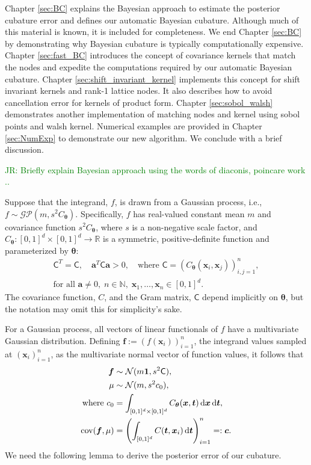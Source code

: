 \documentclass{iitthesis}          %
\newcommand{\bm}[1]{\boldsymbol{#1}}
\newcommand{\dif}[1]{\text{d}{#1}}
\newcommand{\D}[1]{\text{d}{#1}}
\newcommand{\vtheta}{{\bm{\theta}}}
\newcommand{\va}{\bm{a}}
\newcommand{\vc}{\bm{c}}
\newcommand{\vf}{\bm{f}}
\newcommand{\vt}{\bm{t}}
\newcommand{\vx}{\bm{x}}
\newcommand{\vone}{\bm{1}}
\newcommand{\mC}{\mathsf{C}}
\newcommand{\cov}{{\textup{cov}}}
\newcommand{\calN}{\mathcal{N}}
\newcommand{\JRNote}[1]{{\textcolor{green}{JR: #1}}}
\begin{document}
Chapter \ref{sec:BC} explains the Bayesian approach to estimate the posterior cubature error and defines our automatic Bayesian cubature. Although much of this material is known, it is included for completeness.  We end Chapter \ref{sec:BC}  by demonstrating why Bayesian cubature is typically computationally expensive.
Chapter \ref{sec:fast_BC}  introduces the concept of covariance kernels that match the nodes and expedite the computations required by our automatic Bayesian cubature. 
Chapter \ref{sec:shift_invariant_kernel} implements this concept for shift invariant kernels and rank-1 lattice nodes.  It also describes how to avoid cancellation error for kernels of product form.  
Chapter \ref{sec:sobol_walsh} demonstrates another implementation of matching nodes and kernel using sobol points and walsh kernel.
Numerical examples are provided in Chapter \ref{sec:NumExp} to demonstrate our new algorithm.  We conclude with a brief discussion.



\label{sec:BC} 
\JRNote{Briefly explain Bayesian approach using the words of diaconis, poincare work ..}

\label{sec:BayesPostErr}

Suppose that the integrand, $f$, is drawn from a Gaussian process, i.e., $f \sim \mathcal{GP}(m,s^2 C_\vtheta)$.  Specifically, $f$ has real-valued constant mean $m$ and covariance function $s^2C_\vtheta$, where $s$ is a non-negative scale factor, and $C_\vtheta: [0,1]^d \times [0,1]^d \to \mathbb{R} $ is a symmetric, positive-definite function and parameterized by $\vtheta$:
\begin{multline} \label{FJH:eq:CondPosDef}
\mC^T = \mC,  \quad \va^T \mC \va > 0, \quad \text{where }  \mC = \left(  C_\vtheta(\vx_i,\vx_j)  \right)_{i,j=1}^n,\\
 \text{for all } \va \ne 0, \;
 n\in \mathbb{N}, \; \vx_1, \ldots, \vx_n \in [0,1]^d.
\end{multline}
The covariance function, $C$, and the Gram matrix, $\mC$ depend implicitly on $\vtheta$, but the notation may omit this for simplicity's sake.

For a Gaussian process, all vectors of linear functionals of $f$ have a multivariate Gaussian distribution. Defining  $\vf  := \left( f(\vx_i)\right)_{i=1}^n$, the integrand values sampled at $\left( \vx_i\right)_{i=1}^n$,  as the multivariate normal vector of function values, it follows that 
\begin{subequations} \label{eqn:fGaussDist}
\begin{align}
\vf  & \sim \calN(m \vone, s^2 \mC), \\
\mu & \sim \calN(m, s^2 c_0), 
\\
\text{where }
c_0 &= \int_{[0,1]^{d} \times [0,1]^{d}} C_\vtheta(\vx,\vt) \, \dif{\vx} \, \dif{\vt}, \\
\cov(\vf, \mu) &= \left(  \int_{[0,1]^d} C(\vt,\vx_i) \, \D \vt \right)_{i=1}^n  =: \vc.
\end{align}
\end{subequations}
We need the following lemma to derive the posterior error of our cubature. 
\end{document}
